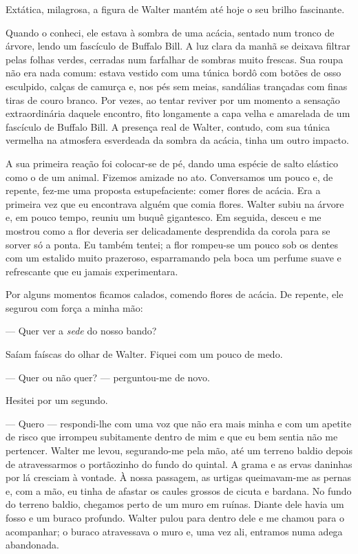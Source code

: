 Extática, milagrosa, a figura de Walter mantém até hoje o seu brilho fascinante.

Quando o conheci, ele estava à sombra de uma acácia, sentado num tronco de árvore, lendo um fascículo de Buffalo Bill.  A luz clara da manhã se deixava filtrar pelas folhas verdes, cerradas num farfalhar de sombras muito frescas. Sua roupa não era nada comum: estava vestido com uma túnica bordô com botões de osso esculpido, calças de camurça e, nos pés sem meias, sandálias trançadas com finas tiras de couro branco. Por vezes, ao tentar reviver por um momento a sensação extraordinária daquele encontro, fito longamente a capa velha e amarelada de um fascículo de Buffalo Bill. A presença real de Walter, contudo, com sua túnica vermelha na atmosfera esverdeada da sombra da acácia, tinha um outro impacto.

A sua primeira reação foi colocar-se de pé, dando uma espécie de salto elástico como o de um animal. Fizemos amizade no ato. Conversamos um pouco e, de repente, fez-me uma proposta estupefaciente: comer flores de acácia. Era a primeira vez que eu encontrava alguém que comia flores. Walter subiu na árvore e, em pouco tempo, reuniu um buquê gigantesco. Em seguida, desceu e me mostrou como a flor deveria ser delicadamente desprendida da corola para se sorver só a ponta. Eu também tentei; a flor rompeu-se um pouco sob os dentes com um estalido muito prazeroso, esparramando pela boca um perfume suave e refrescante que eu jamais experimentara.

Por alguns momentos ficamos calados, comendo flores de acácia. De repente, ele segurou com força a minha mão: 

--- Quer ver a \textit{sede} do nosso bando?

Saíam faíscas do olhar de Walter. Fiquei com um pouco de medo. 

--- Quer ou não quer? --- perguntou-me de novo. 

Hesitei por um segundo. 

--- Quero --- respondi-lhe com uma voz que não era mais minha e com um apetite de risco que irrompeu subitamente dentro de mim e que eu bem sentia não me pertencer.
Walter me levou, segurando-me pela mão, até um terreno baldio depois de atravessarmos o portãozinho do fundo do quintal. A grama e as ervas daninhas por lá cresciam à vontade. À nossa passagem, as urtigas queimavam-me as pernas e, com a mão, eu tinha de afastar os caules grossos de cicuta e bardana. No fundo do terreno baldio, chegamos perto de um muro em ruínas. Diante dele havia um fosso e um buraco profundo. Walter pulou para dentro dele e me chamou para o acompanhar; o buraco atravessava o muro e, uma vez ali, entramos numa adega abandonada.

